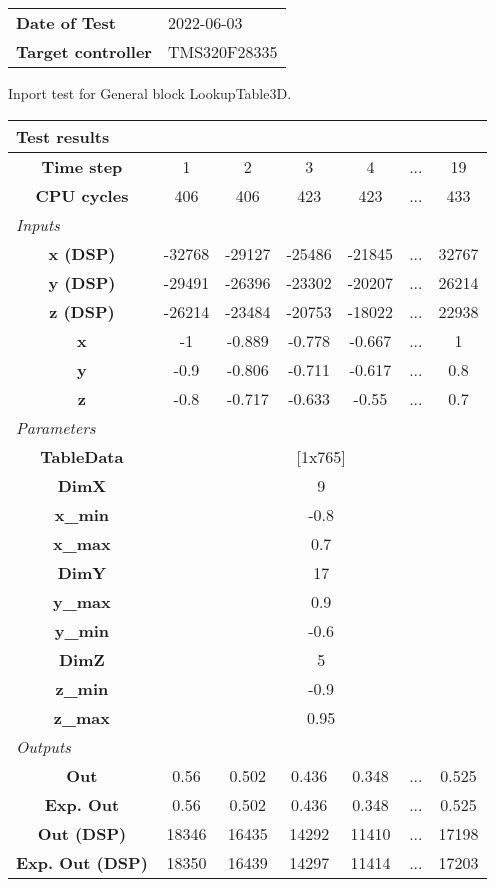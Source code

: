 \begin{tabular}{l l}
\textbf{Date of Test} & 2022-06-03 \tabularnewline
\textbf{Target controller} & TMS320F28335 \tabularnewline
\end{tabular}
\vspace{1ex}
Inport test for General block LookupTable3D.

\vspace{1em}
\begin{tabularx}{\textwidth}{|c|c|c|c|c|>{\centering\arraybackslash}X|c|}
\hline
\multicolumn{7}{|l|}{\cellcolor[gray]{0.8}\textbf{Test results}} \tabularnewline \hline
\textbf{Time step} & 1 & 2 & 3 & 4 & ... & 19 \tabularnewline \hline
\textbf{CPU cycles} & 406 & 406 & 423 & 423 & ... & 433 \tabularnewline \hline
\multicolumn{7}{|l|}{\cellcolor[gray]{0.9}\textit{Inputs}} \tabularnewline \hline
\textbf{x (DSP)} & -32768 & -29127 & -25486 & -21845 & ... & 32767 \tabularnewline \hline
\textbf{y (DSP)} & -29491 & -26396 & -23302 & -20207 & ... & 26214 \tabularnewline \hline
\textbf{z (DSP)} & -26214 & -23484 & -20753 & -18022 & ... & 22938 \tabularnewline \hline
\textbf{x} & -1 & -0.889 & -0.778 & -0.667 & ... & 1 \tabularnewline \hline
\textbf{y} & -0.9 & -0.806 & -0.711 & -0.617 & ... & 0.8 \tabularnewline \hline
\textbf{z} & -0.8 & -0.717 & -0.633 & -0.55 & ... & 0.7 \tabularnewline \hline
\multicolumn{7}{|l|}{\cellcolor[gray]{0.9}\textit{Parameters}} \tabularnewline \hline
\textbf{TableData} & \multicolumn{6}{c|}{[1x765]} \tabularnewline \hline
\textbf{DimX} & \multicolumn{6}{c|}{9} \tabularnewline \hline
\textbf{x\_min} & \multicolumn{6}{c|}{-0.8} \tabularnewline \hline
\textbf{x\_max} & \multicolumn{6}{c|}{0.7} \tabularnewline \hline
\textbf{DimY} & \multicolumn{6}{c|}{17} \tabularnewline \hline
\textbf{y\_max} & \multicolumn{6}{c|}{0.9} \tabularnewline \hline
\textbf{y\_min} & \multicolumn{6}{c|}{-0.6} \tabularnewline \hline
\textbf{DimZ} & \multicolumn{6}{c|}{5} \tabularnewline \hline
\textbf{z\_min} & \multicolumn{6}{c|}{-0.9} \tabularnewline \hline
\textbf{z\_max} & \multicolumn{6}{c|}{0.95} \tabularnewline \hline
\multicolumn{7}{|l|}{\cellcolor[gray]{0.9}\textit{Outputs}} \tabularnewline \hline
\textbf{Out} & 0.56 & 0.502 & 0.436 & 0.348 & ... & 0.525 \tabularnewline \hline
\textbf{Exp. Out} & 0.56 & 0.502 & 0.436 & 0.348 & ... & 0.525 \tabularnewline \hline
\textbf{Out (DSP)} & 18346 & 16435 & 14292 & 11410 & ... & 17198 \tabularnewline \hline
\textbf{Exp. Out (DSP)} & 18350 & 16439 & 14297 & 11414 & ... & 17203 \tabularnewline \hline
\end{tabularx}
\vspace{1ex}


